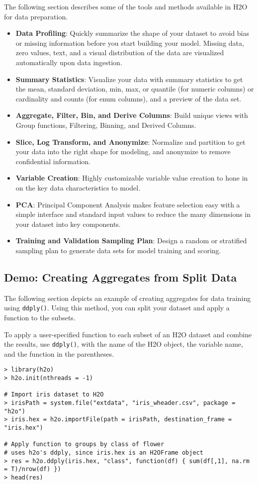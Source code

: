 The following section describes some of the tools and methods available in H2O for data preparation. 
\begin{itemize}
\item {\textbf{Data Profiling}}: Quickly summarize the shape of your dataset to avoid bias or missing information before you start building your model. Missing data, zero values, text, and a visual distribution of the data are visualized automatically upon data ingestion. 
\item {\textbf{Summary Statistics}}: Visualize your data with summary statistics to get the mean, standard deviation, min, max, or quantile (for numeric columns) or cardinality and counts (for enum columns), and a preview of the data set. 
\item {\textbf{Aggregate, Filter, Bin, and Derive Columns}}: Build unique views with Group functions, Filtering, Binning, and Derived Columns. 
\item {\textbf{Slice, Log Transform, and Anonymize}}: Normalize and partition to get your data into the right shape for modeling, and anonymize to remove confidential information. 
\item {\textbf{Variable Creation}}: Highly customizable variable value creation to hone in on the key data characteristics to model. 
\item {\textbf{PCA}}: Principal Component Analysis makes feature selection easy with a simple interface and standard input values to reduce the many dimensions in your dataset into key components. 
\item {\textbf{Training and Validation Sampling Plan}}: Design a random or stratified sampling plan to generate data sets for model training and scoring. 
\end{itemize}

\subsection{Demo: Creating Aggregates from Split Data}

The following section depicts an example of creating aggregates for data training using {\texttt{ddply()}}. Using this method, you can split your dataset and apply a function to the subsets.

To apply a user-specified function to each subset of an H2O dataset and combine the results, use {\texttt{ddply()}}, with the name of the H2O object, the variable name, and the function in the parentheses.

\begin{lstlisting}[style=R]
> library(h2o)
> h2o.init(nthreads = -1)

# Import iris dataset to H2O
> irisPath = system.file("extdata", "iris_wheader.csv", package = "h2o")
> iris.hex = h2o.importFile(path = irisPath, destination_frame = "iris.hex")

# Apply function to groups by class of flower
# uses h2o's ddply, since iris.hex is an H2OFrame object
> res = h2o.ddply(iris.hex, "class", function(df) { sum(df[,1], na.rm = T)/nrow(df) })
> head(res)
\end{lstlisting}

